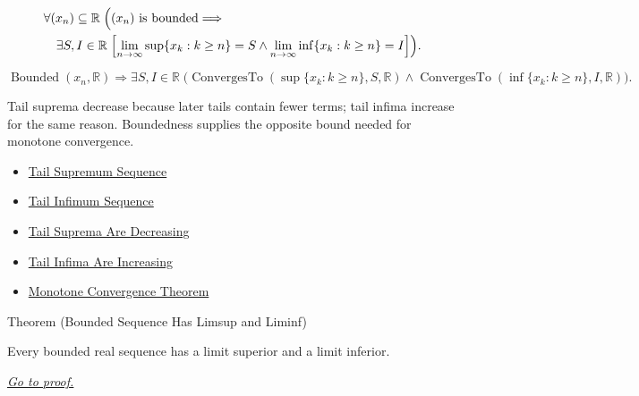 \begin{remark*}
\[
\begin{aligned}
&\forall (x_n)\subseteq\mathbb{R}\;
\Bigl(
  (x_n)\text{ is bounded}
  \Longrightarrow\\
&\quad
  \exists S,I\in\mathbb{R}\;
  \Bigl[
    \lim_{n\to\infty}\sup\{x_k:k\ge n\}=S
    \land
    \lim_{n\to\infty}\inf\{x_k:k\ge n\}=I
  \Bigr]
\Bigr).
\end{aligned}
\]
\end{remark*}

\begin{remark*}
\[
\operatorname{Bounded}(x_n,\mathbb{R})
\Longrightarrow
\exists S,I\in\mathbb{R}\;
\bigl(
  \operatorname{ConvergesTo}(\sup\{x_k:k\ge n\},S,\mathbb{R})
  \land
  \operatorname{ConvergesTo}(\inf\{x_k:k\ge n\},I,\mathbb{R})
\bigr).
\]
\end{remark*}

\begin{remark*}[Interpretation]
Tail suprema decrease because later tails contain fewer terms; tail infima
increase for the same reason. Boundedness supplies the opposite bound needed
for monotone convergence.
\end{remark*}

\begin{dependencies}
\begin{itemize}
  \item \hyperref[def:tail-supremum-sequence]{Tail Supremum Sequence}
  \item \hyperref[def:tail-infimum-sequence]{Tail Infimum Sequence}
  \item \hyperref[thm:tail-suprema-are-decreasing]{Tail Suprema Are Decreasing}
  \item \hyperref[thm:tail-infima-are-increasing]{Tail Infima Are Increasing}
  \item \hyperref[thm:monotone-convergence-theorem]{Monotone Convergence Theorem}
\end{itemize}
\end{dependencies}


\begin{theorembox}{Theorem (Bounded Sequence Has Limsup and Liminf)}
\begin{theorem}
\label{thm:bounded-sequence-limsup-liminf}
Every bounded real sequence has a limit superior and a limit inferior.

\smallskip
\noindent
\hyperref[prf:bounded-sequence-limsup-liminf]{\textit{Go to proof.}}
\end{theorem}
\end{theorembox}

